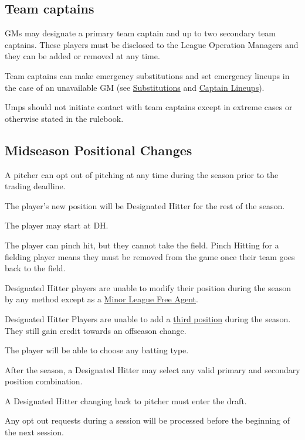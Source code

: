 \subsection{Team captains}
\begin{deepEnumerate}
	\item GMs may designate a primary team captain and up to two secondary team captains.
	These players must be disclosed to the League Operation Managers and they can be added or removed at any time.
	\item Team captains can make emergency substitutions and set emergency lineups in the case of an unavailable GM
	(see \hyperref[sec:substitutions]{Substitutions} and \hyperref[sec:captain lineups]{Captain Lineups}).
	\begin{deepEnumerate}
		\item Umps should not initiate contact with team captains except in extreme cases or otherwise stated in the rulebook.
	\end{deepEnumerate}
\end{deepEnumerate}

\subsection{Midseason Positional Changes}
\begin{deepEnumerate}
	\item A pitcher can opt out of pitching at any time during the season prior to the trading deadline.
	\begin{deepEnumerate}
		\item The player's new position will be Designated Hitter for the rest of the season.
		\begin{deepEnumerate}
			\item The player may start at DH.
			\item The player can pinch hit, but they cannot take the field. Pinch Hitting for a fielding player means they must be removed from the game 
			once their team goes back to the field.
			\item Designated Hitter players are unable to modify their position during the season by any method except as a \hyperref[sec:MiLR FA]{Minor League Free Agent}.
			\item Designated Hitter Players are unable to add a \hyperref[sec:Third position]{third position} during the season. They still gain credit towards an offseason change.
		\end{deepEnumerate}
		\item The player will be able to choose any batting type.
		\item After the season, a Designated Hitter may select any valid primary and secondary position combination.
		\begin{deepEnumerate}
			\item A Designated Hitter changing back to pitcher must enter the draft.
		\end{deepEnumerate}
		\item Any opt out requests during a session will be processed before the beginning of the next session.
	\end{deepEnumerate}
\end{deepEnumerate}

